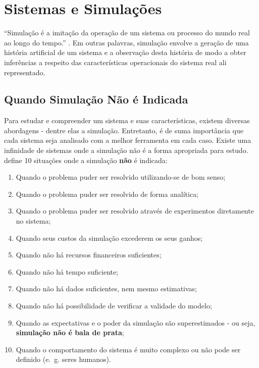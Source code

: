 \chapter{\label{chap:simulation}Sistemas e Simulações}

``Simulação é a imitação da operação de um sistema ou processo do mundo real ao longo do tempo.'' \cite{Banks}. Em outras palavras, simulação envolve a geração de uma história artificial de um sistema e a observação desta história de modo a obter inferências a respeito das características operacionais do sistema real ali representado.

\section{Quando Simulação Não é Indicada}

Para estudar e compreender um sistema e suas características, existem diversas abordagens - dentre elas a simulação. Entretanto, é de suma importância que cada sistema seja analisado com a melhor ferramenta em cada caso. Existe uma infinidade de sistemas onde a simulação não é a forma apropriada para estudo. \cite{BanksGibson} define 10 situações onde a simulação \textbf{não} é indicada:

\begin{enumerate}
\item Quando o problema puder ser resolvido utilizando-se de bom senso;
\item Quando o problema puder ser resolvido de forma analítica;
\item Quando o problema puder ser resolvido através de experimentos diretamente no sistema;
\item Quando seus custos da simulação excederem os seus ganhos;
\item Quando não há recursos financeiros suficientes;
\item Quando não há tempo suficiente;
\item Quando não há dados suficientes, nem mesmo estimativas;
\item Quando não há possibilidade de verificar a validade do modelo;
\item Quando as expectativas e o poder da simulação são superestimados - ou seja, \textbf{simulação não é bala de prata};
\item Quando o comportamento do sistema é muito complexo ou não pode ser definido (e.~g. seres humanos).
\end{enumerate}

